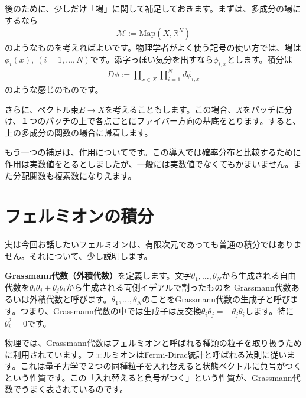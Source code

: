 \documentclass[paper=a4, fontsize=12pt, line_length=16cm, number_of_lines=33,dvipdfmx]{jlreq}
\numberwithin{equation}{section}
\newcommand{\Rb}{\mathbb{R}}
\newcommand{\strong}[1]{\textsf{\bfseries #1}}
\newcommand{\Mcal}{\mathcal{M}}
\begin{document}
後のために、少しだけ「場」に関して補足しておきます。まずは、多成分の場にするなら
\begin{align}
  \Mcal:=\mathrm{Map}(X,\Rb^N)
\end{align}
のようなものを考えればよいです。物理学者がよく使う記号の使い方では、場は$\phi_i(x),\ (i=1,\dots,N)$です。添字っぽい気分を出すなら$\phi_{i,x}$とします。積分は
\begin{align}
  D\phi:=\prod_{x\in X}\prod_{i=1}^{N}d\phi_{i,x}
\end{align}
のような感じのものです。

さらに、ベクトル束$E\to X$を考えることもします。この場合、$X$をパッチに分け、１つのパッチの上で各点ごとにファイバー方向の基底をとります。すると、上の多成分の関数の場合に帰着します。

もう一つの補足は、作用についてです。この導入では確率分布と比較するために作用は実数値をとるとしましたが、一般には実数値でなくてもかまいません。また分配関数も複素数になりえます。

\section{フェルミオンの積分}
実は今回お話したいフェルミオンは、有限次元であっても普通の積分ではありません。それについて、少し説明します。

\strong{Grassmann代数（外積代数）}を定義します。文字$\theta_1,\dots,\theta_N$から生成される自由代数を$\theta_i\theta_j+\theta_j\theta_i$から生成される両側イデアルで割ったものを
Grassmann代数あるいは外積代数と呼びます。$\theta_1,\dots,\theta_N$のことをGrassmann代数の生成子と呼びます。つまり、Grassmann代数の中では生成子は反交換$\theta_i\theta_j=-\theta_j\theta_i$します。特に$\theta_i^2=0$です。

物理では、Grassmann代数はフェルミオンと呼ばれる種類の粒子を取り扱うために利用されています。フェルミオンはFermi-Dirac統計と呼ばれる法則に従います。これは量子力学で２つの同種粒子を入れ替えると状態ベクトルに負号がつくという性質です。この「入れ替えると負号がつく」という性質が、Grassmann代数でうまく表されているのです。
\end{document}
